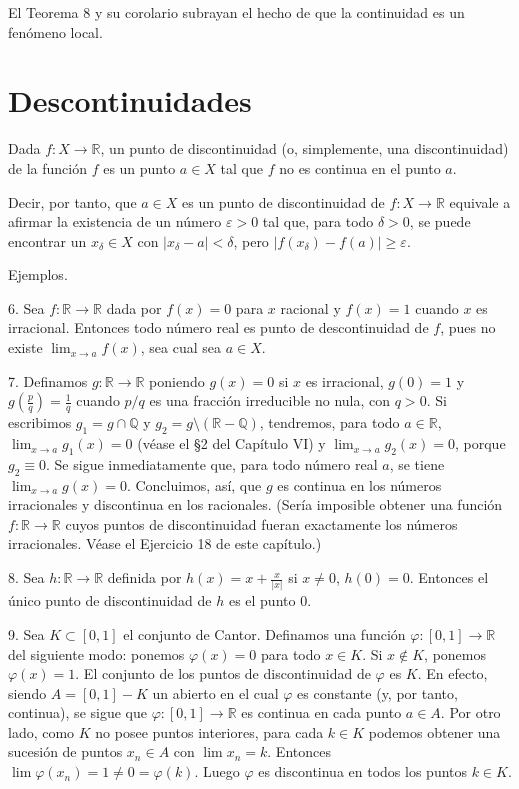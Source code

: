 \documentclass[12pt,oneside]{book}
\begin{document}
El Teorema 8 y su corolario subrayan el hecho de que la continuidad es un fenómeno local.

\section{Descontinuidades}

Dada \(f: X \to \mathbb{R}\), un punto de discontinuidad (o, simplemente, una discontinuidad) de la función \(f\) es un punto \(a \in X\) tal que \(f\) no es continua en el punto \(a\).

Decir, por tanto, que \(a \in X\) es un punto de discontinuidad de \(f: X \to \mathbb{R}\) equivale a afirmar la existencia de un número \(\varepsilon > 0\) tal que, para todo \(\delta > 0\), se puede encontrar un \(x_\delta \in X\) con \(|x_\delta - a| < \delta\), pero \(|f(x_\delta) - f(a)| \geq \varepsilon\).

Ejemplos.

6. Sea \(f: \mathbb{R} \to \mathbb{R}\) dada por \(f(x) = 0\) para \(x\) racional y \(f(x) = 1\) cuando \(x\) es irracional. Entonces todo número real es punto de descontinuidad de \(f\), pues no existe \(\lim_{x \to a} f(x)\), sea cual sea \(a \in X\).

7. Definamos \(g: \mathbb{R} \to \mathbb{R}\) poniendo \(g(x) = 0\) si \(x\) es irracional, \(g(0) = 1\) y \(g\left(\frac{p}{q}\right) = \frac{1}{q}\) cuando \(p/q\) es una fracción irreducible no nula, con \(q > 0\). Si escribimos \(g_1 = g \cap \mathbb{Q}\) y \(g_2 = g \setminus (\mathbb{R} - \mathbb{Q})\), tendremos, para todo \(a \in \mathbb{R}\), \(\lim_{x \to a} g_1(x) = 0\) (véase el §2 del Capítulo VI) y \(\lim_{x \to a} g_2(x) = 0\), porque \(g_2 \equiv 0\). Se sigue inmediatamente que, para todo número real \(a\), se tiene \(\lim_{x \to a} g(x) = 0\). Concluimos, así, que \(g\) es continua en los números irracionales y discontinua en los racionales. (Sería imposible obtener una función \(f: \mathbb{R} \to \mathbb{R}\) cuyos puntos de discontinuidad fueran exactamente los números irracionales. Véase el Ejercicio 18 de este capítulo.)

8. Sea \(h: \mathbb{R} \to \mathbb{R}\) definida por \(h(x) = x + \frac{x}{|x|}\) si \(x \neq 0\), \(h(0) = 0\). Entonces el único punto de discontinuidad de \(h\) es el punto \(0\).

9. Sea \(K \subset [0, 1]\) el conjunto de Cantor. Definamos una función \(\varphi: [0, 1] \to \mathbb{R}\) del siguiente modo: ponemos \(\varphi(x) = 0\) para todo \(x \in K\). Si \(x \notin K\), ponemos \(\varphi(x) = 1\). El conjunto de los puntos de discontinuidad de \(\varphi\) es \(K\). En efecto, siendo \(A = [0, 1] - K\) un abierto en el cual \(\varphi\) es constante (y, por tanto, continua), se sigue que \(\varphi: [0, 1] \to \mathbb{R}\) es continua en cada punto \(a \in A\). Por otro lado, como \(K\) no posee puntos interiores, para cada \(k \in K\) podemos obtener una sucesión de puntos \(x_n \in A\) con \(\lim x_n = k\). Entonces \(\lim \varphi(x_n) = 1 \neq 0 = \varphi(k)\). Luego \(\varphi\) es discontinua en todos los puntos \(k \in K\).
\end{document}

